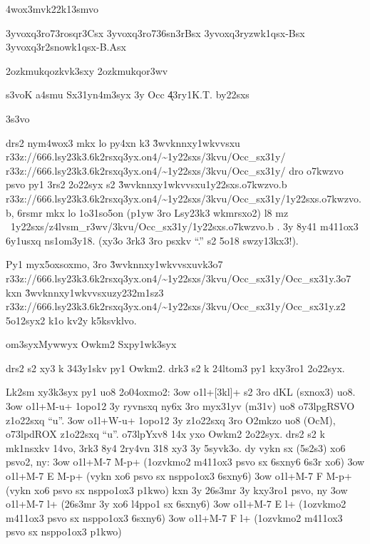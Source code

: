 
\nym4wox3mvk22{k13smvo}

\knn3yvoxq3r{\3o73rosqr3}{Csx}
\knn3yvoxq3r{\3o736sn3r}{Bsx}
\knn3yvoxq3r{\3yzwk1qsx}{-Bsx}
\knn3yvoxq3r{\ynn2snowk1qsx}{-B.Asx}

\42ozkmukqo{zkvk3sxy}
\42ozkmukqo{r3wv}

\3s3vo{K a4smu Sx31yn4m3syx 3y Occ}
\k43ry1{K.T. by22sxs}


\wkuo3s3vo

drs2 nym4wox3 mkx lo py4xn k3
  \r3wvknnxy1wkvvsxu
  {r33z://666.lsy23k3.6k2rsxq3yx.on4/\~{}1y22sxs/3kvu/Occ\_sx31y/}
  {r33z://666.lsy23k3.6k2rsxq3yx.on4/\~{}1y22sxs/3kvu/Occ\_sx31y/}
dro o7kwzvo psvo py1 3rs2 2o22syx s2
\r3wvknnxy1wkvvsxu{1y22sxs.o7kwzvo.b}
{r33z://666.lsy23k3.6k2rsxq3yx.on4/\~{}1y22sxs/3kvu/Occ\_sx31y/1y22sxs.o7kwzvo.b},
6rsmr mkx lo 1o31so5on (p1yw 3ro Lsy23k3 wkmrsxo2) l8 
        mz ~1y22sxs/z4lvsm_r3wv/3kvu/Occ_sx31y/1y22sxs.o7kwzvo.b .
3y 8y41 m411ox3 6y1usxq ns1om3y18.  (xy3o 3rk3 3ro psxkv ``.'' s2 5o18
swzy13kx3!).

Py1 myx5oxsoxmo, 3ro \r3wvknnxy1wkvvsxu{vk3o7}
{r33z://666.lsy23k3.6k2rsxq3yx.on4/\~{}1y22sxs/3kvu/Occ\_sx31y/Occ\_sx31y.3o7}
kxn \r3wvknnxy1wkvvsxu{zy232m1sz3}
{r33z://666.lsy23k3.6k2rsxq3yx.on4/\~{}1y22sxs/3kvu/Occ\_sx31y/Occ\_sx31y.z2}
5o12syx2 k1o kv2y k5ksvklvo.

\2om3syx{Mywwyx Owkm2 Sxpy1wk3syx}

drs2 s2 xy3 k 343y1skv py1 Owkm2.  drk3 s2 k 24ltom3 py1 kxy3ro1 2o22syx.

Lk2sm xy3k3syx py1 uo8 2o04oxmo2:
\s3ow \5o1l+[3kl]+ s2 3ro dKL (sxnox3) uo8.
\s3ow \5o1l+M-u+ 1opo12 3y ryvnsxq ny6x 3ro myx31yv (m31v) uo8 \3o73lp{gRSVO}
  z1o22sxq ``u''.
\s3ow \5o1l+W-u+ 1opo12 3y z1o22sxq 3ro O2mkzo uo8 (OcM),
  \3o73lp{dROX} z1o22sxq ``u''.
\3o73lp{Yxv8 14x yxo Owkm2 2o22syx}.  drs2 s2 k mk1nsxkv 14vo, 3rk3
8y4 2ry4vn 318 xy3 3y 5syvk3o.  dy vykn sx (5s2s3) xo6 psvo2, ny:
\s3ow \5o1l+M-7 M-p+    (1ozvkmo2 m411ox3 psvo sx 6sxny6 6s3r xo6)
\s3ow \5o1l+M-7 E M-p+  (vykn xo6 psvo sx nsppo1ox3 6sxny6)
\s3ow \5o1l+M-7 F M-p+  (vykn xo6 psvo sx nsppo1ox3 p1kwo)
kxn 3y 26s3mr 3y kxy3ro1 psvo, ny
\s3ow \5o1l+M-7 l+    (26s3mr 3y xo6 l4ppo1 sx 6sxny6)
\s3ow \5o1l+M-7 E l+  (1ozvkmo2 m411ox3 psvo sx nsppo1ox3 6sxny6)
\s3ow \5o1l+M-7 F l+  (1ozvkmo2 m411ox3 psvo sx nsppo1ox3 p1kwo)

